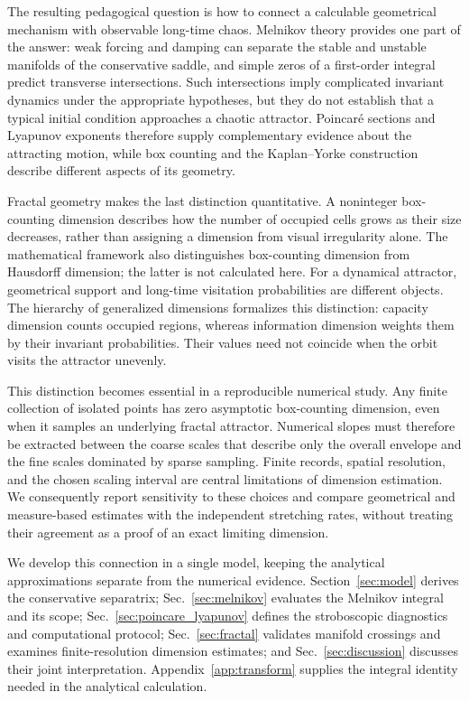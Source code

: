 \documentclass[aps,prb,reprint,floatfix]{revtex4-2}
\begin{document}
The resulting pedagogical question is how to connect a calculable geometrical mechanism with observable long-time chaos. Melnikov theory provides one part of the answer: weak forcing and damping can separate the stable and unstable manifolds of the conservative saddle, and simple zeros of a first-order integral predict transverse intersections.\cite{Melnikov1963,Wiggins2003} Such intersections imply complicated invariant dynamics under the appropriate hypotheses, but they do not establish that a typical initial condition approaches a chaotic attractor. Poincar\'e sections and Lyapunov exponents therefore supply complementary evidence about the attracting motion, while box counting and the Kaplan--Yorke construction describe different aspects of its geometry.\cite{KaplanYorke1979,FarmerOttYorke1983,Ott2002}

Fractal geometry makes the last distinction quantitative. A noninteger box-counting dimension describes how the number of occupied cells grows as their size decreases, rather than assigning a dimension from visual irregularity alone. The mathematical framework also distinguishes box-counting dimension from Hausdorff dimension; the latter is not calculated here.\cite{Falconer2014} For a dynamical attractor, geometrical support and long-time visitation probabilities are different objects. The hierarchy of generalized dimensions formalizes this distinction: capacity dimension counts occupied regions, whereas information dimension weights them by their invariant probabilities.\cite{HentschelProcaccia1983} Their values need not coincide when the orbit visits the attractor unevenly.

This distinction becomes essential in a reproducible numerical study. Any finite collection of isolated points has zero asymptotic box-counting dimension, even when it samples an underlying fractal attractor. Numerical slopes must therefore be extracted between the coarse scales that describe only the overall envelope and the fine scales dominated by sparse sampling. Finite records, spatial resolution, and the chosen scaling interval are central limitations of dimension estimation.\cite{Theiler1990} We consequently report sensitivity to these choices and compare geometrical and measure-based estimates with the independent stretching rates, without treating their agreement as a proof of an exact limiting dimension.

We develop this connection in a single model, keeping the analytical approximations separate from the numerical evidence. Section~\ref{sec:model} derives the conservative separatrix; Sec.~\ref{sec:melnikov} evaluates the Melnikov integral and its scope; Sec.~\ref{sec:poincare_lyapunov} defines the stroboscopic diagnostics and computational protocol; Sec.~\ref{sec:fractal} validates manifold crossings and examines finite-resolution dimension estimates; and Sec.~\ref{sec:discussion} discusses their joint interpretation. Appendix~\ref{app:transform} supplies the integral identity needed in the analytical calculation.
\end{document}
